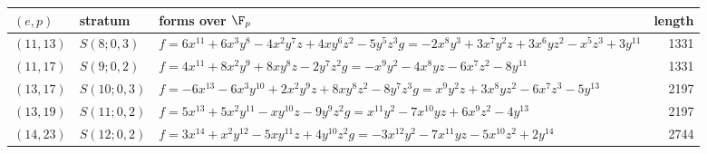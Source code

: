 \begin{tabular}{@{}ll>{\raggedright\arraybackslash}p{6.8cm}r@{}}
\toprule
$(e,p)$ & stratum & forms over $\F_p$ & length\\
\midrule
$(11,13)$ & $S(8;0,3)$ & $f=6x^{11} + 6x^{3}y^{8} - 4x^{2}y^{7}z + 4xy^{6}z^{2} - 5y^{5}z^{3}$\newline $g=-2x^{8}y^{3} + 3x^{7}y^{2}z + 3x^{6}yz^{2} - x^{5}z^{3} + 3y^{11}$ & 1331\\
$(11,17)$ & $S(9;0,2)$ & $f=4x^{11} + 8x^{2}y^{9} + 8xy^{8}z - 2y^{7}z^{2}$\newline $g=-x^{9}y^{2} - 4x^{8}yz - 6x^{7}z^{2} - 8y^{11}$ & 1331\\
$(13,17)$ & $S(10;0,3)$ & $f=-6x^{13} - 6x^{3}y^{10} + 2x^{2}y^{9}z + 8xy^{8}z^{2} - 8y^{7}z^{3}$\newline $g=x^{9}y^{2}z + 3x^{8}yz^{2} - 6x^{7}z^{3} - 5y^{13}$ & 2197\\
$(13,19)$ & $S(11;0,2)$ & $f=5x^{13} + 5x^{2}y^{11} - xy^{10}z - 9y^{9}z^{2}$\newline $g=x^{11}y^{2} - 7x^{10}yz + 6x^{9}z^{2} - 4y^{13}$ & 2197\\
$(14,23)$ & $S(12;0,2)$ & $f=3x^{14} + x^{2}y^{12} - 5xy^{11}z + 4y^{10}z^{2}$\newline $g=-3x^{12}y^{2} - 7x^{11}yz - 5x^{10}z^{2} + 2y^{14}$ & 2744\\
\bottomrule
\end{tabular}
